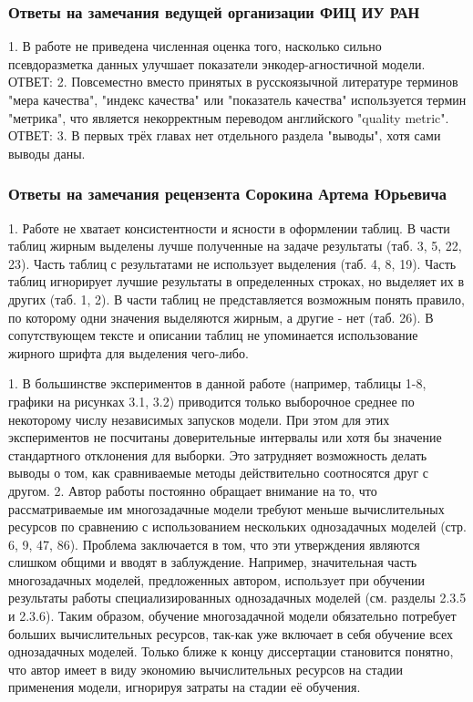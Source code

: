 \iffalse
\begin{frame}
    \frametitle{Ответы на замечания ведущей организации ФИЦ ИУ РАН}
    \begin{itemize}
        1. В работе не приведена численная оценка того, насколько сильно псевдоразметка данных улучшает показатели энкодер-агностичной модели.
        ОТВЕТ:
        2. Повсеместно вместо принятых в русскоязычной литературе терминов "мера качества", "индекс качества" или "показатель качества" используется термин "метрика", что является некорректным переводом английского "quality metric".
        ОТВЕТ:
        3. В первых трёх главах нет отдельного раздела "выводы", хотя сами выводы даны.
    \end{itemize}
\end{frame}

\begin{frame}
    \frametitle{Ответы на замечания рецензента Сорокина Артема Юрьевича}
    \begin{itemize}
1. Работе не хватает консистентности и ясности в оформлении таблиц.  В части таблиц жирным выделены лучше полученные на задаче результаты (таб. 3, 5, 22, 23). Часть таблиц с результатами не использует выделения (таб. 4, 8, 19). Часть таблиц игнорирует лучшие результаты в определенных строках, но выделяет их в других (таб. 1, 2). В части таблиц не представляется возможным понять правило, по которому одни значения выделяются жирным, а другие - нет (таб. 26). В сопутствующем тексте и описании таблиц не упоминается использование жирного шрифта для выделения чего-либо.  

1. В большинстве экспериментов в данной работе (например, таблицы 1-8, графики на рисунках 3.1, 3.2) приводится только выборочное среднее по некоторому числу независимых запусков модели.  При этом для этих экспериментов не посчитаны доверительные интервалы или хотя бы значение стандартного отклонения для выборки. Это затрудняет возможность делать выводы о том, как сравниваемые методы действительно соотносятся друг с другом. 
2. Автор работы постоянно обращает внимание на то, что рассматриваемые им многозадачные модели требуют меньше вычислительных ресурсов по сравнению с использованием нескольких однозадачных моделей (стр. 6, 9, 47, 86). Проблема заключается в том, что эти утверждения являются слишком общими и вводят в заблуждение. Например, значительная часть многозадачных моделей, предложенных автором, использует при обучении результаты работы специализированных однозадачных моделей (см. разделы 2.3.5 и 2.3.6). Таким образом, обучение многозадачной модели обязательно потребует больших вычислительных ресурсов, так-как уже включает в себя обучение всех однозадачных моделей. Только ближе к концу диссертации становится понятно, что автор имеет в виду экономию вычислительных ресурсов на стадии применения модели, игнорируя затраты на стадии её обучения. 
    \end{itemize}
\end{frame}

